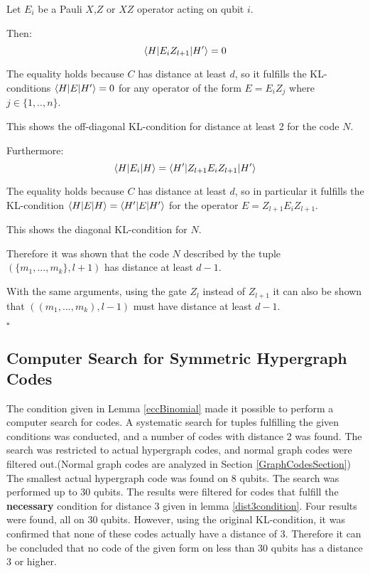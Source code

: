 \documentclass[12pt]{iopart}
\begin{document}
Let $E_i$ be a Pauli $X$,$Z$ or $XZ$ operator acting on qubit $i$.

Then:
\begin{equation}
\braket{H|E_iZ_{l+1}|H^\prime} = 0
\end{equation}

The equality holds because $C$ has distance at least $d$, so it fulfills the KL-conditions $\braket{H|E|H^\prime} = 0$ for any operator of the form $E = E_iZ_j$ where $j \in \{1,..,n\}$.

This shows the off-diagonal KL-condition for distance at least 2 for the code $N$.

Furthermore:
\begin{equation}
\braket{H|E_i|H} =  \braket{H^\prime|Z_{l+1}E_iZ_{l+1}|H^\prime}
\end{equation}

The equality holds because $C$ has distance at least $d$, so in particular it fulfills the KL-condition $\braket{H|E|H} = \braket{H^\prime|E|H^\prime}$ for the operator $E = Z_{l+1}E_iZ_{l+1}$.

This shows the diagonal KL-condition for $N$.

Therefore it was shown that the code $N$ described by the tuple $(\{m_1,...,m_k\},l+1)$ has distance at least $d-1$.

With the same arguments, using the gate $Z_{l}$ instead of $Z_{l+1}$ it can also be shown that $((m_1,...,m_k),l-1)$ must have distance at least $d-1$.

\begin{flushright}
$\square$
\end{flushright}

\subsection{Computer Search for Symmetric Hypergraph Codes}

The condition given in Lemma \ref{eccBinomial} made it possible to perform a computer search for codes. A systematic search for tuples fulfilling the given conditions was conducted, and a number of codes with distance 2 was found. The search was restricted to actual hypergraph codes, and normal graph codes were filtered out.(Normal graph codes are analyzed in Section \ref{GraphCodesSection}) The smallest actual hypergraph code was found on 8 qubits. The search was performed up to 30 qubits.
The results were filtered for codes that fulfill the \textbf{necessary} condition for distance 3 given in lemma \ref{dist3condition}. Four results were found, all on 30 qubits.
However, using the original KL-condition, it was confirmed that none of these codes actually have a distance of 3. 
Therefore it can be concluded that no code of the given form on less than 30 qubits has a distance 3 or higher. 
\end{document}
